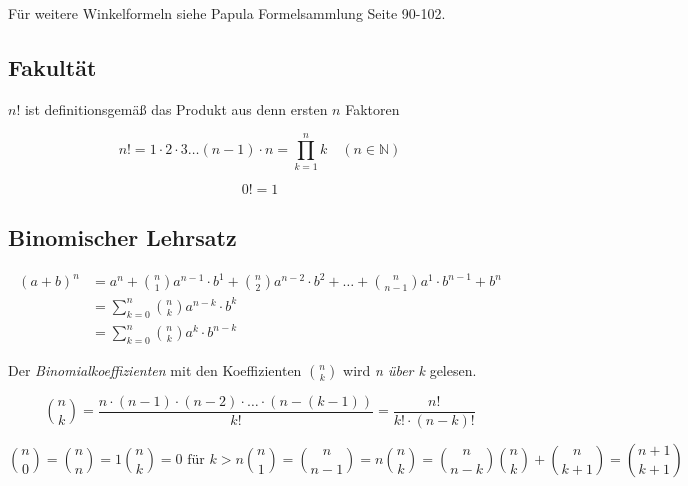 Für weitere Winkelformeln siehe Papula Formelsammlung Seite 90-102.
\subsection{Fakultät}
$n!$ ist definitionsgemäß das Produkt aus denn ersten $n$ Faktoren
\begin{shaded}
 \begin{equation}
  n!=1\cdot 2\cdot 3 \ldots \left(n-1\right)\cdot n= \prod_{k=1}^{n}k \quad \left(n\in \mathbb{N}\right)
 \end{equation}
\end{shaded}
\begin{shaded}
\begin{equation}
 0!=1
\end{equation}
\end{shaded}

\subsection{Binomischer Lehrsatz}
\begin{shaded}
 \begin{align}
  \left(a+b\right)^n&=a^n+\binom{n}{1}a^{n-1}\cdot b^1+\binom{n}{2}a^{n-2}\cdot b^2+\ldots+\binom{n}{n-1}a^{1}\cdot b^{n-1}+b^n \\
  &=\sum_{k=0}^{n}\binom{n}{k}a^{n-k}\cdot b^k \\
  &=\sum_{k=0}^{n}\binom{n}{k}a^{k}\cdot b^{n-k} 
 \end{align}
\end{shaded}

Der \emph{Binomialkoeffizienten} mit den Koeffizienten $\binom{n}{k}$ wird \emph{n über k} gelesen.


\begin{shaded}
\begin{equation}
 \binom{n}{k}=\frac{n\cdot(n-1)\cdot(n-2)\cdot\ldots\cdot(n-(k-1))}{k!}=\frac{n!}{k!\cdot(n-k)!}
\end{equation}
\end{shaded}

\begin{shaded}
\begin{subequations}
\begin{equation}
\binom{n}{0}=\binom{n}{n}=1
\end{equation} 
\begin{equation}
\binom{n}{k}=0 \text{ für } k>n
\end{equation} 
\begin{equation}
\binom{n}{1}=\binom{n}{n-1}=n
\end{equation} 
\begin{equation}
\binom{n}{k}=\binom{n}{n-k}
\end{equation} 
\begin{equation}
\binom{n}{k}+\binom{n}{k+1}=\binom{n+1}{k+1}
\end{equation} 
\end{subequations}
\end{shaded}

